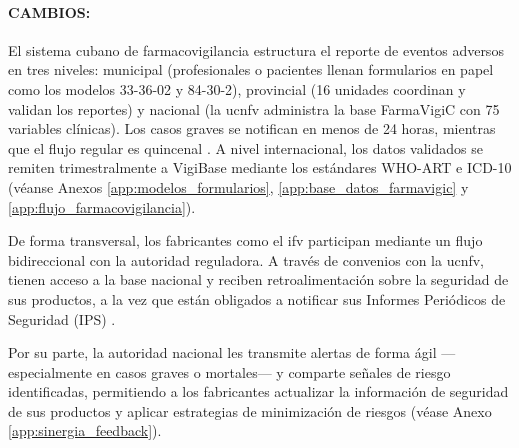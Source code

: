 


\paragraph{CAMBIOS:}

El sistema cubano de farmacovigilancia estructura el reporte de eventos adversos en tres niveles: municipal (profesionales o pacientes llenan formularios en papel como los modelos 33-36-02 y 84-30-2), provincial (16 unidades coordinan y validan los reportes) y nacional (la \gls{ucnfv} administra la base \gls{FarmaVigiC} con 75 variables clínicas). Los casos graves se notifican en menos de 24 horas, mientras que el flujo regular es quincenal \cite{normas_farmacovigilancia_cuba_2012, tarrago_farmacovigilancia_cuba_2019}. A nivel internacional, los datos validados se remiten trimestralmente a \gls{VigiBase} mediante los estándares \gls{WHO-ART} e \gls{ICD-10} \cite{normas_farmacovigilancia_cuba_2012} (véanse Anexos \ref{app:modelos_formularios}, \ref{app:base_datos_farmavigic} y \ref{app:flujo_farmacovigilancia}).

De forma transversal, los fabricantes como el \gls{ifv} participan mediante un flujo bidireccional con la autoridad reguladora. A través de convenios con la \gls{ucnfv}, tienen acceso a la base nacional y reciben retroalimentación sobre la seguridad de sus productos, a la vez que están obligados a notificar sus Informes Periódicos de Seguridad (IPS) \cite{normas_farmacovigilancia_cuba_2012}.

Por su parte, la autoridad nacional les transmite alertas de forma ágil —especialmente en casos graves o mortales— y comparte señales de riesgo identificadas, permitiendo a los fabricantes actualizar la información de seguridad de sus productos y aplicar estrategias de minimización de riesgos \cite{normas_farmacovigilancia_cuba_2012} (véase Anexo \ref{app:sinergia_feedback}).




